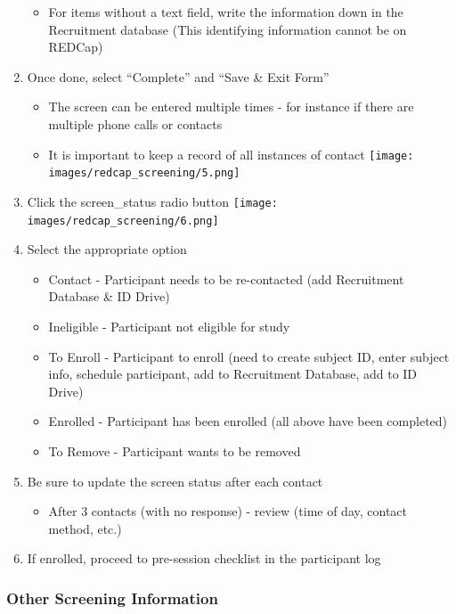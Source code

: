 \documentclass[
]{book}
\providecommand{\tightlist}{%
  \setlength{\itemsep}{0pt}\setlength{\parskip}{0pt}}
\begin{document}
\begin{enumerate}
  \begin{itemize}
  \tightlist
  \item
    For items without a text field, write the information down in the Recruitment database (This identifying information cannot be on REDCap)
  \end{itemize}
\item
  Once done, select ``Complete'' and ``Save \& Exit Form''

  \begin{itemize}
  \tightlist
  \item
    The screen can be entered multiple times - for instance if there are multiple phone calls or contacts
  \item
    It is important to keep a record of all instances of contact
    \texttt{[image: images/redcap\_screening/5.png]}
  \end{itemize}
\item
  Click the screen\_status radio button
  \texttt{[image: images/redcap\_screening/6.png]}
\item
  Select the appropriate option

  \begin{itemize}
  \tightlist
  \item
    Contact - Participant needs to be re-contacted (add Recruitment Database \& ID Drive)
  \item
    Ineligible - Participant not eligible for study
  \item
    To Enroll - Participant to enroll (need to create subject ID, enter subject info, schedule participant, add to Recruitment Database, add to ID Drive)
  \item
    Enrolled - Participant has been enrolled (all above have been completed)
  \item
    To Remove - Participant wants to be removed
  \end{itemize}
\item
  Be sure to update the screen status after each contact

  \begin{itemize}
  \tightlist
  \item
    After 3 contacts (with no response) - review (time of day, contact method, etc.)
  \end{itemize}
\item
  If enrolled, proceed to pre-session checklist in the participant log
\end{enumerate}

\hypertarget{other-screening-information}{%
\subsubsection{Other Screening Information}\label{other-screening-information}}
\end{document}

